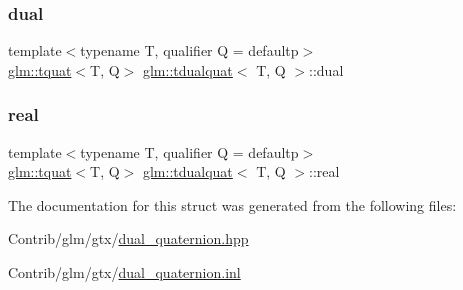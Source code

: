 \subsubsection{\texorpdfstring{dual}{dual}}
{\footnotesize\ttfamily template$<$typename T, qualifier Q = defaultp$>$ \\
\mbox{\hyperlink{structglm_1_1tquat}{glm\+::tquat}}$<$T, Q$>$ \mbox{\hyperlink{structglm_1_1tdualquat}{glm\+::tdualquat}}$<$ T, Q $>$\+::dual}

\mbox{\label{structglm_1_1tdualquat_a25909f92feb14a77756d2e83f9ec0b20}} 
\subsubsection{\texorpdfstring{real}{real}}
{\footnotesize\ttfamily template$<$typename T, qualifier Q = defaultp$>$ \\
\mbox{\hyperlink{structglm_1_1tquat}{glm\+::tquat}}$<$T, Q$>$ \mbox{\hyperlink{structglm_1_1tdualquat}{glm\+::tdualquat}}$<$ T, Q $>$\+::real}



The documentation for this struct was generated from the following files\+:\begin{DoxyCompactItemize}
\item 
Contrib/glm/gtx/\mbox{\hyperlink{dual__quaternion_8hpp}{dual\+\_\+quaternion.\+hpp}}\item 
Contrib/glm/gtx/\mbox{\hyperlink{dual__quaternion_8inl}{dual\+\_\+quaternion.\+inl}}\end{DoxyCompactItemize}

